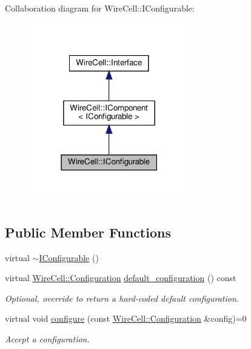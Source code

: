 Collaboration diagram for Wire\+Cell\+:\+:I\+Configurable\+:
\nopagebreak
\begin{figure}[H]
\begin{center}
\leavevmode
\includegraphics[width=198pt]{class_wire_cell_1_1_i_configurable__coll__graph}
\end{center}
\end{figure}
\subsection*{Public Member Functions}
\begin{DoxyCompactItemize}
\item 
virtual \hyperlink{class_wire_cell_1_1_i_configurable_a077835c4ce9cf9ed14f3a573570d6efb}{$\sim$\+I\+Configurable} ()
\item 
virtual \hyperlink{namespace_wire_cell_a9f705541fc1d46c608b3d32c182333ee}{Wire\+Cell\+::\+Configuration} \hyperlink{class_wire_cell_1_1_i_configurable_a54841b2da3d1ea02189478bff96f7998}{default\+\_\+configuration} () const
\begin{DoxyCompactList}\small\item\em Optional, override to return a hard-\/coded default configuration. \end{DoxyCompactList}\item 
virtual void \hyperlink{class_wire_cell_1_1_i_configurable_a57ff687923a724093df3de59c6ff237d}{configure} (const \hyperlink{namespace_wire_cell_a9f705541fc1d46c608b3d32c182333ee}{Wire\+Cell\+::\+Configuration} \&config)=0
\begin{DoxyCompactList}\small\item\em Accept a configuration. \end{DoxyCompactList}\end{DoxyCompactItemize}
